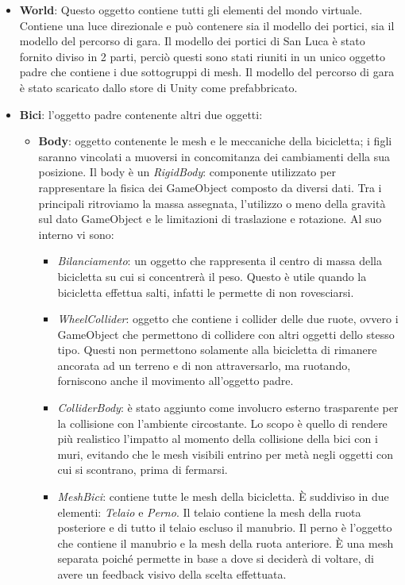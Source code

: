 \begin{itemize}
  \item \textbf{World}: Questo oggetto contiene tutti gli elementi del mondo virtuale. Contiene una luce direzionale e può contenere sia il modello dei portici, sia il modello del percorso di gara. Il modello dei portici di San Luca è stato fornito diviso in 2 parti, perciò questi sono stati riuniti in un unico oggetto padre che contiene i due sottogruppi di mesh. Il modello del percorso di gara è stato scaricato dallo store di Unity come prefabbricato.
  \item \textbf{Bici}: l'oggetto padre contenente altri due oggetti:
		\begin{itemize}
  			\item \textbf{Body}: oggetto contenente le mesh e le meccaniche della bicicletta; i figli saranno vincolati a muoversi in concomitanza dei cambiamenti della sua posizione. Il body è un \textit{RigidBody}: componente utilizzato per rappresentare la fisica dei GameObject composto da diversi dati. Tra i principali ritroviamo la massa assegnata, l’utilizzo o meno della gravità sul dato GameObject e le limitazioni di traslazione e rotazione. Al suo interno vi sono:
					\begin{itemize}
			  			\item \textit{Bilanciamento}: un oggetto che rappresenta il centro di massa della bicicletta su cui si concentrerà il peso. Questo è utile quando la bicicletta effettua salti, infatti le permette di non rovesciarsi.
			  			\item \textit{WheelCollider}: oggetto che contiene i collider delle due ruote, ovvero i GameObject che permettono di collidere con altri oggetti dello stesso tipo. Questi non permettono solamente alla bicicletta di rimanere ancorata ad un terreno e di non attraversarlo, ma ruotando, forniscono anche il movimento all'oggetto padre.
						\item \textit{ColliderBody}: è stato aggiunto come involucro esterno trasparente per la collisione con l’ambiente circostante. Lo scopo è quello di rendere più realistico l'impatto al momento della collisione della bici con i muri, evitando che le mesh visibili entrino per metà negli oggetti con cui si scontrano, prima di fermarsi.
						\item \textit{MeshBici}: contiene tutte le mesh della bicicletta. È suddiviso in due elementi: \textit{Telaio} e \textit{Perno}. Il telaio contiene la mesh della ruota posteriore e di tutto il telaio escluso il manubrio. Il perno è l'oggetto che contiene il manubrio e la mesh della ruota anteriore. È una mesh separata poiché permette in base a dove si deciderà di voltare, di avere un feedback visivo della scelta effettuata.

\end{itemize}
\end{itemize}
\end{itemize}
